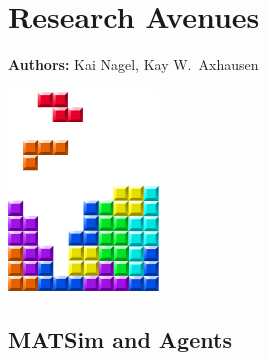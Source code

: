\chapter{Research Avenues }
\label{ch:researchavenues}

\hfill \textbf{Authors:} Kai Nagel, Kay W.\ Axhausen

\begin{center} \includegraphics[width=0.3\textwidth, angle=0]{figures/MATSimBook.png} \end{center}

\section{MATSim and Agents}

%
%








